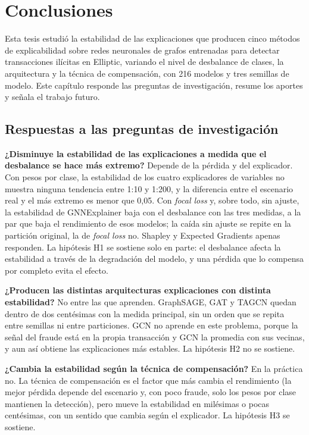 \chapter{Conclusiones}\label{cap:conclusiones}

Esta tesis estudió la estabilidad de las explicaciones que producen cinco métodos de
explicabilidad sobre redes neuronales de grafos entrenadas para detectar transacciones ilícitas
en Elliptic, variando el nivel de desbalance de clases, la arquitectura y la técnica de
compensación, con 216 modelos y tres semillas de modelo. Este capítulo responde las preguntas de
investigación, resume los aportes y señala el trabajo futuro.

\section{Respuestas a las preguntas de investigación}

\textbf{¿Disminuye la estabilidad de las explicaciones a medida que el desbalance se hace más
extremo?} Depende de la pérdida y del explicador. Con pesos por clase, la estabilidad de los
cuatro explicadores de variables no muestra ninguna tendencia entre 1:10 y 1:200, y la
diferencia entre el escenario real y el más extremo es menor que 0,05. Con \textit{focal loss}
y, sobre todo, sin ajuste, la estabilidad de GNNExplainer baja con el desbalance con las tres
medidas, a la par que baja el rendimiento de esos modelos; la caída sin ajuste se repite en la
partición original, la de \textit{focal loss} no. Shapley y Expected Gradients apenas
responden. La hipótesis H1 se sostiene solo en parte: el desbalance afecta la estabilidad a
través de la degradación del modelo, y una pérdida que lo compensa por completo evita el
efecto.

\textbf{¿Producen las distintas arquitecturas explicaciones con distinta estabilidad?} No entre
las que aprenden. GraphSAGE, GAT y TAGCN quedan dentro de dos centésimas con la medida
principal, sin un orden que se repita entre semillas ni entre particiones. GCN no aprende en
este problema, porque la señal del fraude está en la propia transacción y GCN la promedia con
sus vecinas, y aun así obtiene las explicaciones más estables. La hipótesis H2 no se sostiene.

\textbf{¿Cambia la estabilidad según la técnica de compensación?} En la práctica no. La técnica
de compensación es el factor que más cambia el rendimiento (la mejor pérdida depende del
escenario y, con poco fraude, solo los pesos por clase mantienen la detección), pero mueve la
estabilidad en milésimas o pocas centésimas, con un sentido que cambia según el explicador. La
hipótesis H3 se sostiene.

